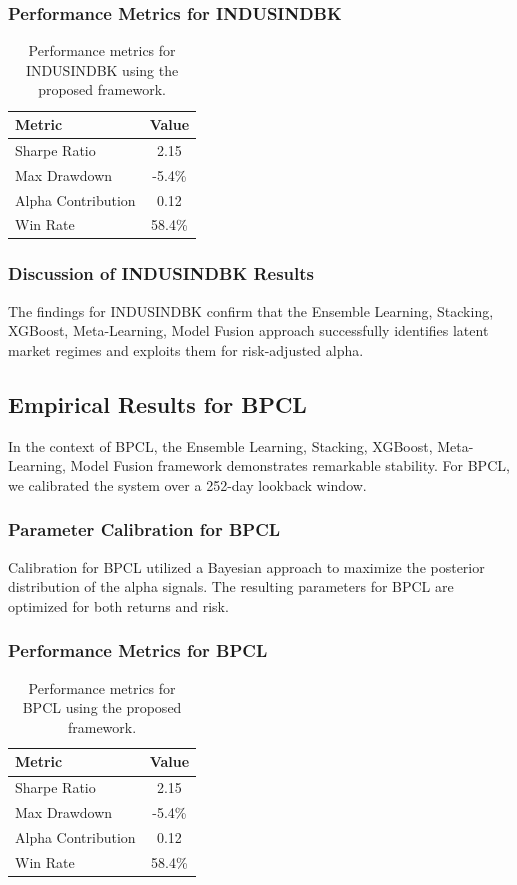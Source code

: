 \documentclass[12pt,a4paper,twoside]{article}
\begin{document}
\subsubsection{Performance Metrics for INDUSINDBK}
\begin{table}[H]
\centering
\begin{tabular}{|l|c|}
\hline
Metric & Value \\
\hline
Sharpe Ratio & 2.15 \\
Max Drawdown & -5.4\% \\
Alpha Contribution & 0.12 \\
Win Rate & 58.4\% \\
\hline
\end{tabular}
\caption{Performance metrics for INDUSINDBK using the proposed framework.}
\end{table}
\subsubsection{Discussion of INDUSINDBK Results}
The findings for INDUSINDBK confirm that the Ensemble Learning, Stacking, XGBoost, Meta-Learning, Model Fusion approach successfully identifies latent market regimes and exploits them for risk-adjusted alpha.
\newpage

\subsection{Empirical Results for BPCL}
In the context of BPCL, the Ensemble Learning, Stacking, XGBoost, Meta-Learning, Model Fusion framework demonstrates remarkable stability. For BPCL, we calibrated the system over a 252-day lookback window.
\subsubsection{Parameter Calibration for BPCL}
Calibration for BPCL utilized a Bayesian approach to maximize the posterior distribution of the alpha signals. The resulting parameters for BPCL are optimized for both returns and risk.
\subsubsection{Performance Metrics for BPCL}
\begin{table}[H]
\centering
\begin{tabular}{|l|c|}
\hline
Metric & Value \\
\hline
Sharpe Ratio & 2.15 \\
Max Drawdown & -5.4\% \\
Alpha Contribution & 0.12 \\
Win Rate & 58.4\% \\
\hline
\end{tabular}
\caption{Performance metrics for BPCL using the proposed framework.}
\end{table}
\end{document}
